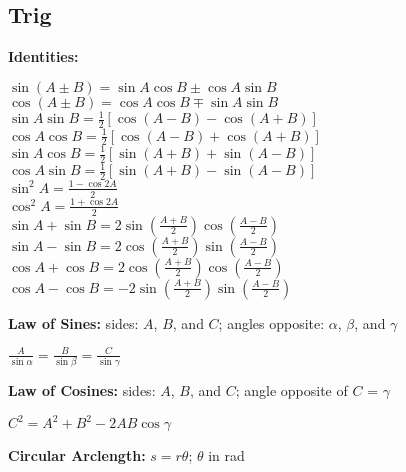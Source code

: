 \documentclass[letterpaper,landscape,10pt]{article}
\begin{document}
{\begin{multicols}{3}
	\subsection*{Trig}
	\textbf{Identities:}
	\begin{center}
		$\displaystyle\sin (A\pm B) =  \sin A\cos B\pm \cos A\sin B$ \\
		$\displaystyle\cos (A\pm B) =  \cos A\cos B\mp \sin A\sin B$ \\
		\vspace{4pt}
		$\displaystyle\sin A\sin B =
			\frac{1}{2}\left[\cos(A-B)-\cos(A+B)\right]$\\
		$\displaystyle\cos A\cos B =
			\frac{1}{2}\left[\cos(A-B)+\cos(A+B)\right]$\\
		$\displaystyle\sin A\cos B =
			\frac{1}{2}\left[\sin(A+B)+\sin(A-B)\right]$\\
		$\displaystyle\cos A\sin B =
			\frac{1}{2}\left[\sin(A+B)-\sin(A-B)\right]$\\
		\vspace{4pt}
		$\displaystyle\sin^{2}A =  \frac{1-\cos 2A}{2}$ \\
		$\displaystyle\cos^{2}A =  \frac{1+\cos 2A}{2}$ \\
		\vspace{4pt}
		$\displaystyle\sin A + \sin B =  2\sin\left(\frac{A+B}{2}\right)
			\cos\left(\frac{A-B}{2}\right)$ \\
		$\displaystyle\sin A - \sin B =  2\cos\left(\frac{A+B}{2}\right)
			\sin\left(\frac{A-B}{2}\right)$ \\
		$\displaystyle\cos A + \cos B =  2\cos\left(\frac{A+B}{2}\right)
			\cos\left(\frac{A-B}{2}\right)$ \\
		$\displaystyle\cos A - \cos B =  -2\sin\left(\frac{A+B}{2}\right)
			\sin\left(\frac{A-B}{2}\right)$
	\end{center}
		\textbf{Law of Sines:} sides: $A$, $B$, and $C$; angles opposite:
		$\alpha$, $\beta$, and $\gamma$
	\begin{center}
		$\frac{A}{\sin \alpha} = \frac{B}{\sin \beta} = \frac{C}{\sin
			\gamma}$
	\end{center}
		\textbf{Law of Cosines:} sides: $A$, $B$, and $C$; angle opposite of
		$C$ = $\gamma$
	\begin{center}
		$C^2 = A^2 + B^2 - 2AB \cos \gamma$
	\end{center}
		\textbf{Circular Arclength:} $s = r\theta$; $\theta$ in rad


\end{multicols}}
\end{document}
